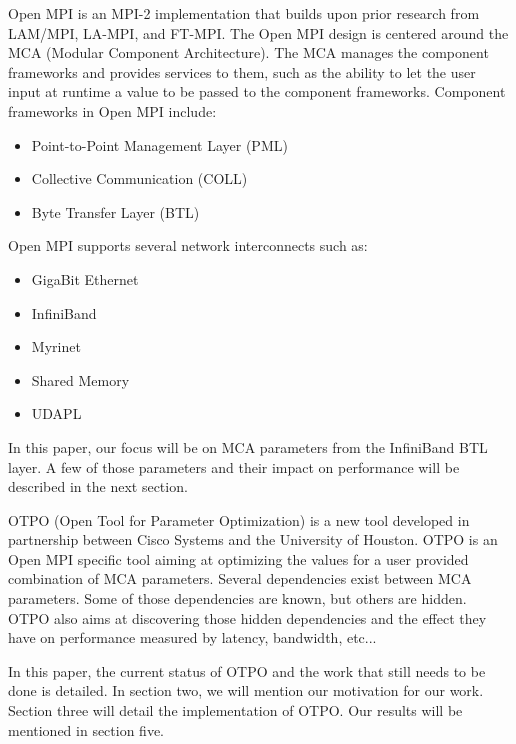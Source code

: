 Open MPI\cite{gabriel:ompi} is an MPI-2\cite{mpi1} implementation that
builds upon prior research from LAM/MPI\cite{lammpi}, LA-MPI\cite{la-mpi},
and FT-MPI\cite{ftmpi}. The Open MPI design is centered around the MCA
(Modular Component Architecture). The MCA manages the component frameworks and
provides services to them, such as the ability to let the user input at
runtime a value to be passed to the component frameworks. Component frameworks
in Open MPI include:
\begin{itemize}
\item Point-to-Point Management Layer (PML)
\item Collective Communication (COLL)
\item Byte Transfer Layer (BTL)
\end{itemize}

Open MPI supports several network interconnects such as:
\begin{itemize}
\item GigaBit Ethernet
\item InfiniBand\cite{ib}
\item Myrinet
\item Shared Memory
\item UDAPL
\end{itemize}

In this paper, our focus will be on MCA parameters from the InfiniBand BTL
layer. A few of those parameters and their impact on performance will be
described in the next section.

OTPO (Open Tool for Parameter Optimization) is a new tool developed in
partnership between Cisco Systems and the University of Houston. OTPO is an
Open MPI specific tool aiming at optimizing the values for a user
provided combination of MCA parameters. Several dependencies exist between MCA
parameters. Some of those dependencies are known, but others are hidden. OTPO
also aims at discovering those hidden dependencies and the effect they have on
performance measured by latency, bandwidth, etc...

In this paper, the current status of OTPO and the work that still needs
to be done is detailed. In section two, we will mention our motivation for our 
work. Section three will detail the implementation of OTPO. Our results will be
mentioned in section five.
